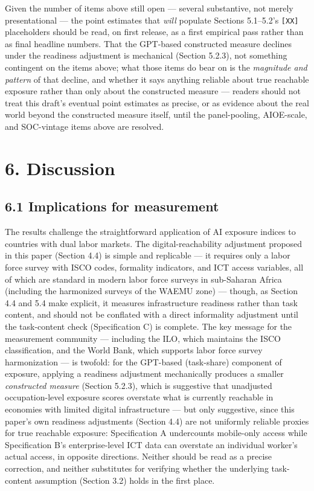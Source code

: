\documentclass[
  11pt,
]{article}
\begin{document}
Given the number of items above still open --- several substantive, not
merely presentational --- the point estimates that \emph{will} populate
Sections 5.1--5.2's \texttt{{[}XX{]}} placeholders should be read, on
first release, as a first empirical pass rather than as final headline
numbers. That the GPT-based constructed measure declines under the
readiness adjustment is mechanical (Section 5.2.3), not something
contingent on the items above; what those items do bear on is the
\emph{magnitude and pattern} of that decline, and whether it says
anything reliable about true reachable exposure rather than only about
the constructed measure --- readers should not treat this draft's
eventual point estimates as precise, or as evidence about the real world
beyond the constructed measure itself, until the panel-pooling,
AIOE-scale, and SOC-vintage items above are resolved.

\section{6. Discussion}\label{discussion}

\subsection{6.1 Implications for
measurement}\label{implications-for-measurement}

The results challenge the straightforward application of AI exposure
indices to countries with dual labor markets. The digital-reachability
adjustment proposed in this paper (Section 4.4) is simple and replicable
--- it requires only a labor force survey with ISCO codes, formality
indicators, and ICT access variables, all of which are standard in
modern labor force surveys in sub-Saharan Africa (including the
harmonized surveys of the WAEMU zone) --- though, as Section 4.4 and 5.4
make explicit, it measures infrastructure readiness rather than task
content, and should not be conflated with a direct informality
adjustment until the task-content check (Specification C) is complete.
The key message for the measurement community --- including the ILO,
which maintains the ISCO classification, and the World Bank, which
supports labor force survey harmonization --- is twofold: for the
GPT-based (task-share) component of exposure, applying a readiness
adjustment mechanically produces a smaller \emph{constructed measure}
(Section 5.2.3), which is suggestive that unadjusted occupation-level
exposure scores overstate what is currently reachable in economies with
limited digital infrastructure --- but only suggestive, since this
paper's own readiness adjustments (Section 4.4) are not uniformly
reliable proxies for true reachable exposure: Specification A
undercounts mobile-only access while Specification B's enterprise-level
ICT data can overstate an individual worker's actual access, in opposite
directions. Neither should be read as a precise correction, and neither
substitutes for verifying whether the underlying task-content assumption
(Section 3.2) holds in the first place.
\end{document}
